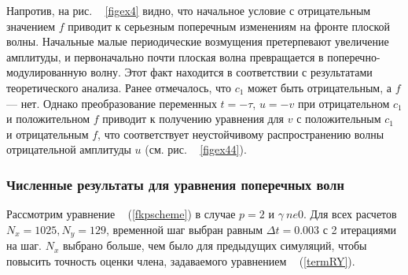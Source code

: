 Напротив, на рис. ~ \ref{figex4} видно, что начальное условие с отрицательным значением $ f $ приводит к серьезным поперечным изменениям на фронте плоской волны. Начальные малые периодические возмущения претерпевают увеличение амплитуды, и первоначально почти плоская волна превращается в поперечно-модулированную волну. Этот факт находится в соответствии с результатами теоретического анализа. Ранее отмечалось, что $ c_1 $ может быть отрицательным, а $ f $ --- нет. Однако преобразование переменных $ t = - \tau $, $ u = -v $ при отрицательном $ c_1 $ и положительном $ f $ приводит к получению уравнения для $ v $ с положительным $ c_1 $ и отрицательным $ f $, что соответствует неустойчивому распространению волны отрицательной амплитуды $ u $ (см. рис. ~ \ref{figex44}).

\subsubsection{Численные результаты для уравнения поперечных волн}

Рассмотрим уравнение ~ (\ref{fkpscheme}) в случае $ p = 2 $ и $ \gamma \ ne 0 $.
Для всех расчетов $ N_x = 1025, N_y = 129 $, временной шаг выбран равным $ \Delta t = 0.003 $ с 2 итерациями на шаг. $ N_x $ выбрано больше, чем было для предыдущих симуляций, чтобы повысить точность оценки члена, задаваемого уравнением ~ (\ref{termRY}).

